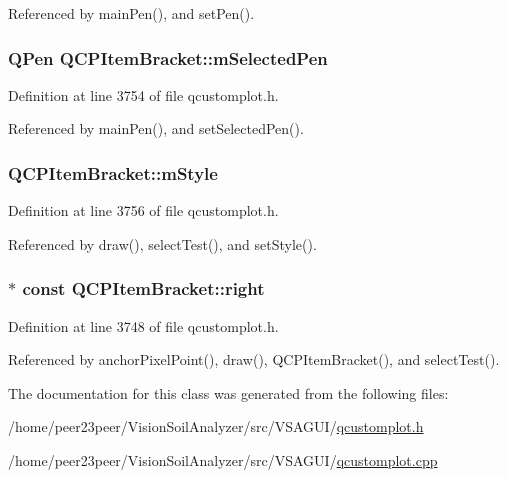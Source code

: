 Referenced by main\+Pen(), and set\+Pen().

\hypertarget{class_q_c_p_item_bracket_adcfb53602d1802d00e2de4fd6df6b291}{}
\subsubsection[{m\+Selected\+Pen}]{\setlength{\rightskip}{0pt plus 5cm}Q\+Pen Q\+C\+P\+Item\+Bracket\+::m\+Selected\+Pen\hspace{0.3cm}{\ttfamily [protected]}}\label{class_q_c_p_item_bracket_adcfb53602d1802d00e2de4fd6df6b291}


Definition at line 3754 of file qcustomplot.\+h.



Referenced by main\+Pen(), and set\+Selected\+Pen().

\hypertarget{class_q_c_p_item_bracket_ac911907184c824d621f274f8e0990080}{}
\subsubsection[{m\+Style}]{ Q\+C\+P\+Item\+Bracket\+::m\+Style\hspace{0.3cm}{\ttfamily [protected]}}\label{class_q_c_p_item_bracket_ac911907184c824d621f274f8e0990080}


Definition at line 3756 of file qcustomplot.\+h.



Referenced by draw(), select\+Test(), and set\+Style().

\hypertarget{class_q_c_p_item_bracket_afa6c1360b05a50c4e0df37b3cebab6be}{}
\subsubsection[{right}]{$\ast$ const Q\+C\+P\+Item\+Bracket\+::right}\label{class_q_c_p_item_bracket_afa6c1360b05a50c4e0df37b3cebab6be}


Definition at line 3748 of file qcustomplot.\+h.



Referenced by anchor\+Pixel\+Point(), draw(), Q\+C\+P\+Item\+Bracket(), and select\+Test().



The documentation for this class was generated from the following files\+:\begin{DoxyCompactItemize}
\item 
/home/peer23peer/\+Vision\+Soil\+Analyzer/src/\+V\+S\+A\+G\+U\+I/\hyperlink{qcustomplot_8h}{qcustomplot.\+h}\item 
/home/peer23peer/\+Vision\+Soil\+Analyzer/src/\+V\+S\+A\+G\+U\+I/\hyperlink{qcustomplot_8cpp}{qcustomplot.\+cpp}\end{DoxyCompactItemize}

